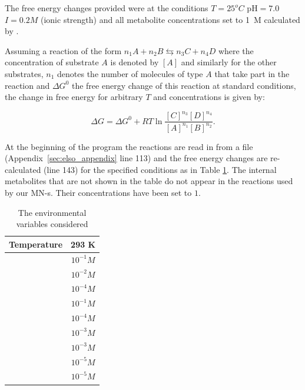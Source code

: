 \documentclass[a4paper,12pt]{article}
\begin{document}
	The free energy changes provided were at the conditions $T=25 ^o C$ pH$=7.0$ $I=0.2 M$ (ionic strength) and all metabolite concentrations set to 1~M calculated by \cite{BartekLower}. 
	
	Assuming a reaction of the form $n_1A + n_2B \leftrightarrows n_3C + n_4D$ where the concentration of substrate $A$ is denoted by $[A]$ and similarly for the other substrates, $n_1$ denotes the number of molecules of type $A$ that take part in the reaction and $\Delta G^0$ the free energy change of this reaction at standard conditions, the change in free energy for arbitrary $T$ and concentrations is given by: 
	
	\begin{equation}\label{eq:freeechange}
		\Delta G = \Delta G^0 + R T \ln \frac{[C]^{n_3}[D]^{n_4}}{[A]^{n_1}[B]^{n_2}}.
	\end{equation}
	
	At the beginning of the program the reactions are read in from a file (Appendix~\ref{sec:elso_appendix} line 113) and the free energy changes are re-calculated (line 143) for the specified conditions as in Table \ref{environmentTable}. The internal metabolites that are not shown in the table do not appear in the reactions used by our MN-s. Their concentrations have been set to $1$. 
	
	\begin{table}
		\centering
	\begin{tabular}{|c|c|}
		
		\hline Temperature & 293 K \\ 
		\hline [ATP] & $10^{-1} M$ \\ 
		\hline [ADP] & $10^{-2} M$ \\ 
		\hline [AMP] & $10^{-4} M$ \\ 
		\hline [NAD$^+$] & $10^{-1} M$ \\ 
		\hline [NADH] & $10^{-4} M$ \\ 
		\hline [Pi] & $10^{-3} M$\\ 
		\hline [PPi] & $10^{-3} M$ \\ 
		\hline [CO$_2$] & $10^{-5} M$ \\ 
		\hline [NH$_3$] & $10^{-5} M$ \\ 

		\hline 
	\end{tabular} 
	\caption{The environmental variables considered}
	\label{environmentTable}
	\end{table}
\end{document}
